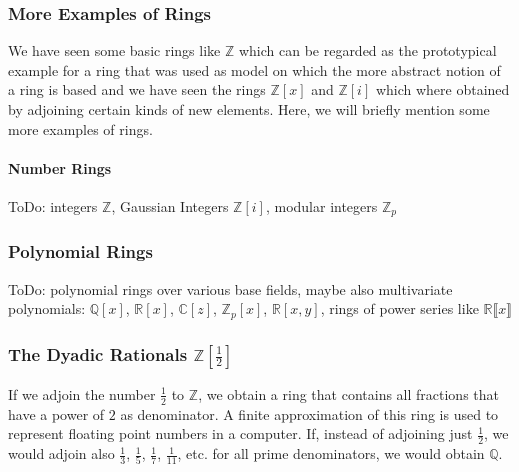 \subsubsection{More Examples of Rings}
We have seen some basic rings like $\mathbb{Z}$ which can be regarded as the prototypical example for a ring that was used as model on which the more abstract notion of a ring is based and we have seen the rings $\mathbb{Z}[x]$ and $\mathbb{Z}[i]$ which where obtained by adjoining certain kinds of new elements. Here, we will briefly mention some more examples of rings.

\paragraph{Number Rings}
ToDo: integers $\mathbb{Z}$, Gaussian Integers $\mathbb{Z}[i]$, modular integers $\mathbb{Z}_p$

\subsubsection{Polynomial Rings}
ToDo: polynomial rings over various base fields, maybe also multivariate polynomials: $\mathbb{Q}[x]$, $\mathbb{R}[x]$, $\mathbb{C}[z]$, $\mathbb{Z}_p[x]$, $\mathbb{R}[x,y]$, rings of power series like
$\mathbb{R} \llbracket x \rrbracket$


\subsubsection{The Dyadic Rationals $\mathbb{Z}[\frac{1}{2}]$}
If we adjoin the number $\frac{1}{2}$ to $\mathbb{Z}$, we obtain a ring that contains all fractions that have a power of $2$ as denominator. A finite approximation of this ring is used to represent floating point numbers in a computer. If, instead of adjoining just $\frac{1}{2}$, we would adjoin also $\frac{1}{3}$, $\frac{1}{5}$, $\frac{1}{7}$, $\frac{1}{11}$, etc. for all prime denominators, we would obtain $\mathbb{Q}$.

